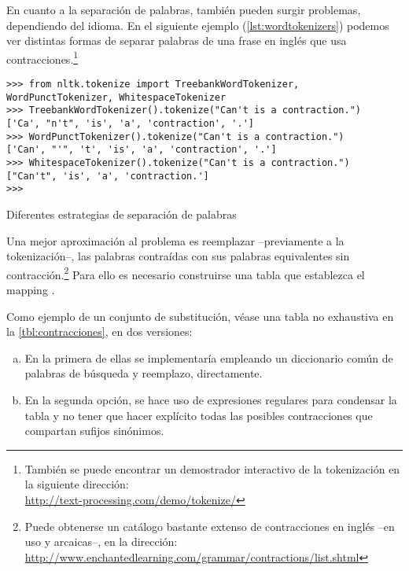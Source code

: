 En cuanto a la separación de palabras, también pueden surgir problemas, dependiendo del idioma. En el siguiente ejemplo (\autoref{lst:wordtokenizers}) podemos ver distintas formas de separar palabras de una frase en inglés que usa contracciones.\footnote{También se puede encontrar un demostrador interactivo de la tokenización en la siguiente dirección:\\
\url{http://text-processing.com/demo/tokenize/}}

\begin{listing}[H]
\begin{verbatim}
>>> from nltk.tokenize import TreebankWordTokenizer, WordPunctTokenizer, WhitespaceTokenizer
>>> TreebankWordTokenizer().tokenize("Can't is a contraction.")
['Ca', "n't", 'is', 'a', 'contraction', '.']
>>> WordPunctTokenizer().tokenize("Can't is a contraction.")
['Can', "'", 't', 'is', 'a', 'contraction', '.']
>>> WhitespaceTokenizer().tokenize("Can't is a contraction.")
["Can't", 'is', 'a', 'contraction.']
>>> 
\end{verbatim}
\caption{Diferentes estrategias de separación de palabras}
\label{lst:wordtokenizers}
\end{listing}

Una mejor aproximación al problema es reemplazar --previamente a la tokenización--, las palabras contraídas con sus palabras equivalentes sin contracción.\footnote{Puede obtenerse un catálogo bastante extenso de contracciones en inglés --en uso y arcaicas--, en la dirección: \url{http://www.enchantedlearning.com/grammar/contractions/list.shtml}}
Para ello es necesario construirse una tabla que establezca el mapping \citep{Perkins2014}.

Como ejemplo de un conjunto de substitución, véase una tabla no exhaustiva en la \autoref{tbl:contracciones}, en dos versiones:
\nopagebreak
\begin{enumerate}[(a)]
\item En la primera de ellas se implementaría empleando un diccionario común de palabras de búsqueda y reemplazo, directamente.
\item En la segunda opción, se hace uso de expresiones regulares para condensar la tabla y no tener que hacer explícito todas las posibles contracciones que compartan sufijos sinónimos.
\end{enumerate}

